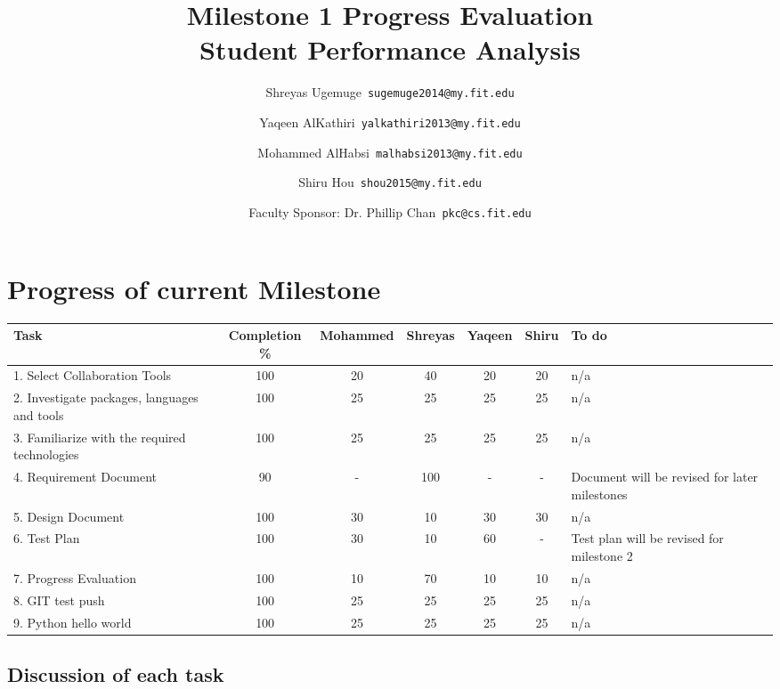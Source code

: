 \documentclass[12pt]{article}
\begin{document}
	\title{\textbf{Milestone 1 Progress Evaluation} \\ \hfill \break
	Student Performance Analysis}
	\author{Shreyas Ugemuge\      \texttt{sugemuge2014@my.fit.edu}
  \and
  Yaqeen AlKathiri\      \texttt{yalkathiri2013@my.fit.edu}
  \and
	Mohammed AlHabsi\      \texttt{malhabsi2013@my.fit.edu}
  \and
  Shiru Hou\      \texttt{shou2015@my.fit.edu}
  \and
  Faculty Sponsor: Dr. Phillip Chan\      \texttt{pkc@cs.fit.edu}}
	\maketitle
	\pagebreak
	\singlespacing
	\tableofcontents
	\pagebreak
	\section{Progress of current Milestone}
	\begin{tabularx}{\textwidth}{|X|c|c|c|c|c|X|}
	\hline
	\textbf{Task} & \textbf{Completion \%} & \textbf{Mohammed} & \textbf{Shreyas} & \textbf{Yaqeen} & \textbf{Shiru} & \textbf{To do} \\ \hline
	1. Select Collaboration Tools & 100 & 20 & 40 & 20 & 20 & n/a \\ \hline
	2. Investigate packages, languages and tools & 100 & 25 & 25 & 25 & 25 & n/a \\ \hline
	3. Familiarize with the required technologies & 100 & 25 & 25 & 25 & 25 & n/a \\ \hline
	4. Requirement Document & 90 & - & 100 & - & - & Document will be revised for later milestones \\ \hline
	5. Design Document & 100 & 30 & 10 & 30 & 30 & n/a \\ \hline
	6. Test Plan & 100 & 30 & 10 & 60 & - & Test plan will be revised for milestone 2 \\ \hline
	7. Progress Evaluation & 100 & 10 & 70 & 10 & 10 & n/a \\ \hline
	8. GIT test push & 100 & 25 & 25 & 25 & 25 & n/a \\ \hline
	9. Python hello world & 100 & 25 & 25 & 25 & 25 & n/a \\ \hline
	\end{tabularx}

	\subsection{Discussion of each task}
\end{document}
